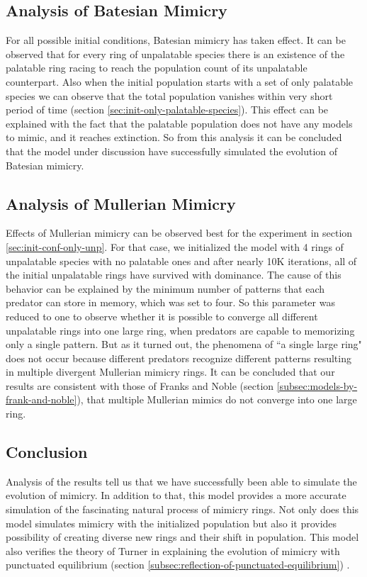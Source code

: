\documentclass[letterpaper]{article}
\numberwithin{equation}{section}
\begin{document}
\subsection{Analysis of Batesian Mimicry}
\label{sec:result-batesian-mimicry}
For all possible initial conditions, Batesian mimicry has taken effect. It can be observed that for every ring of unpalatable species there is an existence of the palatable ring racing to reach the population count of its unpalatable counterpart. Also when the initial population starts with a set of only palatable species we can observe that the total population vanishes within very short period of time (section \ref{sec:init-only-palatable-species}). This effect can be explained with the fact that the palatable population does not have any models to mimic, and it reaches extinction. So from this analysis it can be concluded that the model under discussion have successfully simulated the evolution of Batesian mimicry.

\subsection{Analysis of Mullerian Mimicry}
\label{sec:result-mullerian-mimicry}
Effects of Mullerian mimicry can be observed best for the experiment in section \ref{sec:init-conf-only-unp}. For that case, we initialized the model with 4 rings of unpalatable species with no palatable ones and after nearly 10K iterations, all of the initial unpalatable rings have survived with dominance. The cause of this behavior can be explained by the minimum number of patterns that each predator can store in memory, which was set to four. So this parameter was reduced to one to observe whether it is possible to converge all different unpalatable rings into one large ring, when predators are capable to memorizing only a single pattern. But as it turned out, the phenomena of ``a single large ring" does not occur because different predators recognize different patterns resulting in multiple divergent Mullerian mimicry rings. It can be concluded that our results are consistent with those of Franks and Noble (section \ref{subsec:models-by-frank-and-noble}), that multiple Mullerian mimics do not converge into one large ring.

\subsection{Conclusion}
\label{sec:result-conclusion}
Analysis of the results tell us that we have successfully been able to simulate the evolution of mimicry. In addition to that, this model provides a more accurate simulation of the fascinating natural process of mimicry rings. Not only does this model simulates mimicry with the initialized population but also it provides possibility of creating diverse new rings and their shift in population. This model also verifies the theory of Turner in explaining the evolution of mimicry with punctuated equilibrium (section \ref{subsec:reflection-of-punctuated-equilibrium}) \cite{turner1988}.
\end{document}

